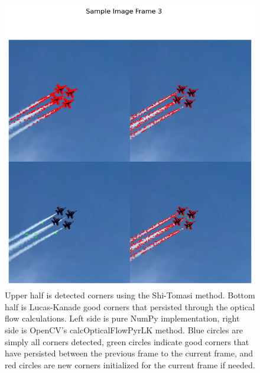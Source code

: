 \documentclass[11pt, conference, letterpaper]{IEEEtran}
\begin{document}
\begin{figure}[h]
    \centering
    \includegraphics[width=0.8\linewidth]{images/sample_image_3.png}
    \caption{Upper half is detected corners using the Shi-Tomasi method. Bottom half is Lucas-Kanade good corners that persisted through the optical flow calculations. Left side is pure NumPy implementation, right side is OpenCV's calcOpticalFlowPyrLK method. Blue circles are simply all corners detected, green circles indicate good corners that have persisted between the previous frame to the current frame, and red circles are new corners initialized for the current frame if needed.}
    \label{fig:sample_4}
\end{figure}
\twocolumn
\end{document}
